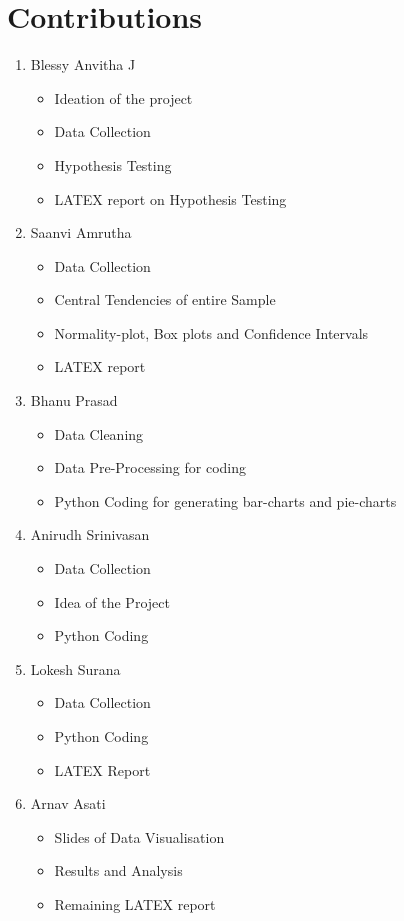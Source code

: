 \documentclass{article}
\begin{document}
\section{Contributions}
\begin{enumerate}
\item Blessy Anvitha J
\begin{itemize}
  \item Ideation of the project
  \item Data Collection
  \item Hypothesis Testing 
  \item LATEX report on Hypothesis Testing
\end{itemize}
\item Saanvi Amrutha
\begin{itemize}
  \item Data Collection
  \item Central Tendencies of entire Sample
  \item Normality-plot, Box plots and Confidence Intervals
  \item LATEX report
\end{itemize}
\item Bhanu Prasad
\begin{itemize}
  \item Data Cleaning
  \item Data Pre-Processing for coding
  \item Python Coding for generating bar-charts and pie-charts
\end{itemize}
\item Anirudh Srinivasan
\begin{itemize}
  \item Data Collection
  \item Idea of the Project
  \item Python Coding
\end{itemize}
\item Lokesh Surana
\begin{itemize}
  \item Data Collection
  \item Python Coding
  \item LATEX Report
\end{itemize}
\item Arnav Asati
\begin{itemize}
  \item Slides of Data Visualisation
  \item Results and Analysis
  \item Remaining LATEX report

\end{itemize}
\end{enumerate}
\end{document}
